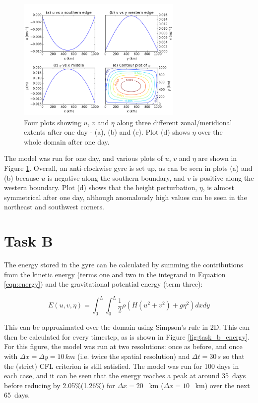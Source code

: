 \documentclass{article}
\begin{document}
\begin{figure}[ht!]
    \centering
    \includegraphics[width=300px]{figures/task_a}
    \caption{Four plots showing $u$, $v$ and $\eta$ along three different zonal/meridional extents
	after one day - (a), (b) and (c). Plot (d) shows $\eta$ over the whole domain after one
    day.}
    \label{fig:task_a}
\end{figure}

The model was run for one day, and various plots of $u$, $v$ and $\eta$ are shown in Figure
\ref{fig:task_a}. Overall, an anti-clockwise gyre is set up, as can be seen in plots (a) and (b)
because $u$ is negative along the southern boundary, and $v$ is positive along the western boundary.
Plot (d) shows that the height perturbation, $\eta$, is almost symmetrical after one day, although
anomalously high values can be seen in the northeast and southwest corners.

\section*{Task B}

The energy stored in the gyre can be calculated by summing the contributions from the kinetic energy
(terms one and two in the integrand in Equation \ref{eqn:energy}) and the gravitational potential
energy (term three):

\begin{equation}
    \label{eqn:energy} 
    E(u, v, \eta) = \int_0^L \int_0^L \frac{1}{2} \rho ( H ( u^2 + v^2) + g \eta^2) dx dy
\end{equation}

This can be approximated over the domain using Simpson's rule in 2D. This can then be calculated for
every timestep, as is shown in Figure \ref{fig:task_b_energy}. For this figure, the model was run at
two resolutions: once as before, and once with $\Delta x = \Delta y = 10\, km$ (i.e. twice the
spatial resolution) and $\Delta t = 30\, s$ so that the (strict) CFL criterion is still satisfied.
The model was run for 100 days in each case, and it can be seen that the energy reaches a peak at
around \SI{35}{days} before reducing by 2.05\%(1.26\%) for $\Delta x = 20$ \SI{}{km} ($\Delta x =
10$ \SI{}{km}) over the next \SI{65}{days}.
\end{document}
